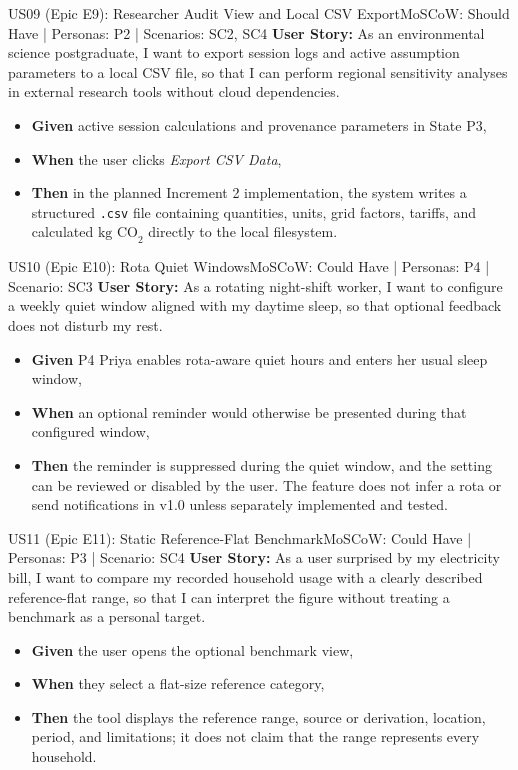 \documentclass[12pt, a4paper]{article}
\begin{document}
\begin{storybox}{US09 (Epic E9): Researcher Audit View and Local CSV Export}{MoSCoW: Should Have | Personas: P2 | Scenarios: SC2, SC4}
\textbf{User Story:} As an environmental science postgraduate, I want to export session logs and active assumption parameters to a local CSV file, so that I can perform regional sensitivity analyses in external research tools without cloud dependencies.
\begin{itemize}
    \item \textbf{Given} active session calculations and provenance parameters in State P3,
    \item \textbf{When} the user clicks \textit{Export CSV Data},
    \item \textbf{Then} in the planned Increment 2 implementation, the system writes a structured \texttt{.csv} file containing quantities, units, grid factors, tariffs, and calculated $\text{kg CO}_2$ directly to the local filesystem.
\end{itemize}
\end{storybox}

\begin{storybox}{US10 (Epic E10): Rota Quiet Windows}{MoSCoW: Could Have | Personas: P4 | Scenario: SC3}
\textbf{User Story:} As a rotating night-shift worker, I want to configure a weekly quiet window aligned with my daytime sleep, so that optional feedback does not disturb my rest.
\begin{itemize}
    \item \textbf{Given} P4 Priya enables rota-aware quiet hours and enters her usual sleep window,
    \item \textbf{When} an optional reminder would otherwise be presented during that configured window,
    \item \textbf{Then} the reminder is suppressed during the quiet window, and the setting can be reviewed or disabled by the user. The feature does not infer a rota or send notifications in v1.0 unless separately implemented and tested.
\end{itemize}
\end{storybox}


\begin{storybox}{US11 (Epic E11): Static Reference-Flat Benchmark}{MoSCoW: Could Have | Personas: P3 | Scenario: SC4}
\textbf{User Story:} As a user surprised by my electricity bill, I want to compare my recorded household usage with a clearly described reference-flat range, so that I can interpret the figure without treating a benchmark as a personal target.
\begin{itemize}
    \item \textbf{Given} the user opens the optional benchmark view,
    \item \textbf{When} they select a flat-size reference category,
    \item \textbf{Then} the tool displays the reference range, source or derivation, location, period, and limitations; it does not claim that the range represents every household.
\end{itemize}
\end{storybox}
\end{document}
